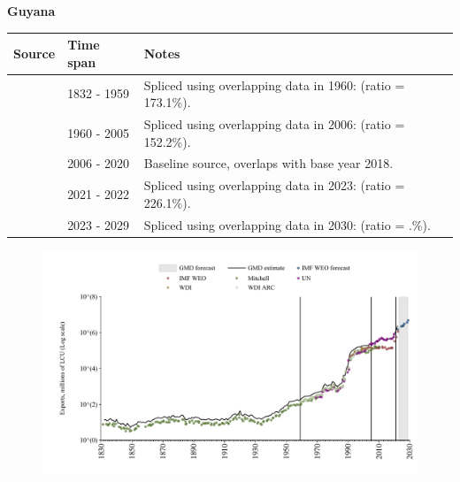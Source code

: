 \documentclass[12pt,a4paper,landscape]{article}
\begin{document}
\begin{adjustbox}{max totalsize={\paperwidth}{\paperheight},center}
\begin{minipage}[t][\textheight][t]{\textwidth}
\vspace*{0.5cm}
{}
\begin{center}
{\Large\bfseries Guyana}
\end{center}
\vspace{0.5cm}
\begin{table}[H]
\centering
\small
\begin{tabular}{|l|l|l|}
\hline
\textbf{Source} & \textbf{Time span} & \textbf{Notes} \\
\hline
\rowcolor{white}\cite{Mitchell}& 1832 - 1959 &Spliced using overlapping data in 1960: (ratio = 173.1\%).\\
\rowcolor{lightgray}\cite{WDI}& 1960 - 2005 &Spliced using overlapping data in 2006: (ratio = 152.2\%).\\
\rowcolor{white}\cite{UN}& 2006 - 2020 &Baseline source, overlaps with base year 2018.\\
\rowcolor{lightgray}\cite{IMF_WEO}& 2021 - 2022 &Spliced using overlapping data in 2023: (ratio = 226.1\%).\\
\rowcolor{white}\cite{IMF_WEO_forecast}& 2023 - 2029 &Spliced using overlapping data in 2030: (ratio = .\%).\\
\hline
\end{tabular}
\end{table}
\begin{figure}[H]
\centering
\includegraphics[width=\textwidth,height=0.6\textheight,keepaspectratio]{graphs/GUY_exports.pdf}
\end{figure}
\end{minipage}
\end{adjustbox}
\end{document}
